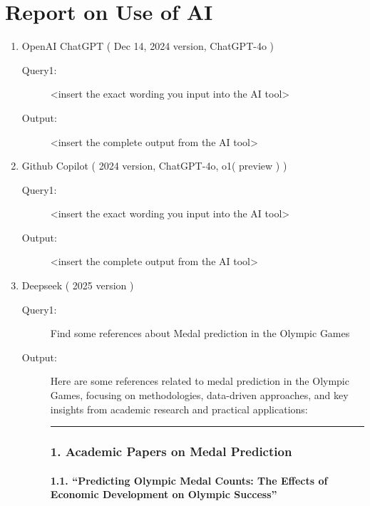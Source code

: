 \setcounter{lastpage}{\value{page}}
\thispagestyle{empty} 

\section*{Report on Use of AI}

\begin{enumerate}
\item OpenAI ChatGPT ( Dec 14, 2024 version, ChatGPT-4o ) 
\begin{description}
\item[Query1:] <insert the exact wording you input into the AI tool> 
\item[Output:] <insert the complete output from the AI tool>
\end{description}
\item Github Copilot ( 2024 version, ChatGPT-4o, o1( preview ) ) 
\begin{description}
\item[Query1:] <insert the exact wording you input into the AI tool> 
\item[Output:] <insert the complete output from the AI tool>
\end{description}

\item Deepseek ( 2025 version )
\begin{description}
    \item[Query1:] Find some references about Medal prediction in the Olympic Games 
    \item[Output:] 
    Here are some references related to medal prediction in the Olympic
Games, focusing on methodologies, data-driven approaches, and key
insights from academic research and practical applications:

\begin{center}\rule{0.5\linewidth}{0.5pt}\end{center}

\hypertarget{academic-papers-on-medal-prediction}{%
\subsubsection*{\texorpdfstring{\textbf{1. Academic Papers on Medal
Prediction}}{1. Academic Papers on Medal Prediction}}\label{academic-papers-on-medal-prediction}}

\hypertarget{predicting-olympic-medal-counts-the-effects-of-economic-development-on-olympic-success}{%
\paragraph{\texorpdfstring{\textbf{1.1. ``Predicting Olympic Medal
Counts: The Effects of Economic Development on Olympic
Success''}}{1.1. ``Predicting Olympic Medal Counts: The Effects of Economic Development on Olympic Success''}}\label{predicting-olympic-medal-counts-the-effects-of-economic-development-on-olympic-success}}


\end{description}
\end{enumerate}
